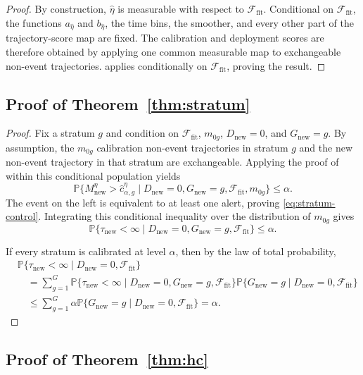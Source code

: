 \documentclass[11pt]{article}
\newcommand{\Pp}{\mathbb{P}}
\newcommand{\calF}{\mathcal{F}}
\begin{document}
\begin{proof}
By construction, $\widehat\eta$ is measurable with respect to $\calF_{\mathrm{fit}}$. Conditional on $\calF_{\mathrm{fit}}$, the functions $a_{\widehat\eta}$ and $b_{\widehat\eta}$, the time bins, the smoother, and every other part of the trajectory-score map are fixed. The calibration and deployment scores are therefore obtained by applying one common measurable map to exchangeable non-event trajectories.  applies conditionally on $\calF_{\mathrm{fit}}$, proving the result.
\end{proof}

\subsection{Proof of Theorem~\ref{thm:stratum}}

\begin{proof}
Fix a stratum $g$ and condition on $\calF_{\mathrm{fit}}$, $m_{0g}$, $D_{\mathrm{new}}=0$, and $G_{\mathrm{new}}=g$. By assumption, the $m_{0g}$ calibration non-event trajectories in stratum $g$ and the new non-event trajectory in that stratum are exchangeable. Applying the proof of  within this conditional population yields
\[
\Pp\{M_{\mathrm{new}}^{\eta}>
\widehat c_{\alpha,g}^{\eta}
\mid D_{\mathrm{new}}=0,G_{\mathrm{new}}=g,
\calF_{\mathrm{fit}},m_{0g}\}
\le\alpha.
\]
The event on the left is equivalent to at least one alert, proving \eqref{eq:stratum-control}. Integrating this conditional inequality over the distribution of $m_{0g}$ gives
\[
\Pp\{\tau_{\mathrm{new}}<\infty
\mid D_{\mathrm{new}}=0,G_{\mathrm{new}}=g,
\calF_{\mathrm{fit}}\}\le\alpha.
\]

If every stratum is calibrated at level $\alpha$, then by the law of total probability,
\begin{align*}
&\Pp\{\tau_{\mathrm{new}}<\infty\mid D_{\mathrm{new}}=0,\calF_{\mathrm{fit}}\}\\
&\quad=\sum_{g=1}^{G}
\Pp\{\tau_{\mathrm{new}}<\infty
\mid D_{\mathrm{new}}=0,G_{\mathrm{new}}=g,
\calF_{\mathrm{fit}}\}
\Pp\{G_{\mathrm{new}}=g\mid D_{\mathrm{new}}=0,\calF_{\mathrm{fit}}\}\\
&\quad\le\sum_{g=1}^{G}\alpha
\Pp\{G_{\mathrm{new}}=g\mid D_{\mathrm{new}}=0,\calF_{\mathrm{fit}}\}
=\alpha.
\end{align*}
\end{proof}

\subsection{Proof of Theorem~\ref{thm:hc}}
\end{document}
